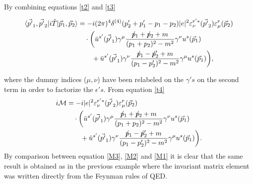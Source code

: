 \begin{example}
\begin{footnotesize}
\begin{equation}
\begin{split}
		\end{split}
		\label{t3}
	\end{equation}
	\end{footnotesize} 
	By combining equations \eqref{t2} and \eqref{t3}
	\begin{footnotesize}
	 \begin{equation}
		\begin{split}
			\braket{\vec{p'}_1,\vec{p'}_2|i\hat{T}|\vec{p}_1, \vec{p}_2}&=-i(2\pi)^4\delta^{(4)}(p'_2+p'_1-p_1-p_2)|e|^2\varepsilon_\nu^{r'*}(\vec{p'}_2)\varepsilon_\mu^{r}(\vec{p}_2)\\
			&\quad\cdot\bigg(\bar{u}^{s'}(\vec{p'}_1)\gamma^\mu \frac{\slashed p_1+\slashed p_2+m}{(p_1+p_2)^2-m^2}\gamma^\nu u^s(\vec{p}_1)\\
			&\qquad+\bar{u}^{s'}(\vec{p'}_1)\gamma^\nu \frac{\slashed p_1-\slashed p'_2+m}{(p_1-p'_2)^2-m^2}\gamma^\mu u^s(\vec{p}_1)\bigg),
		\end{split}
		\label{t4}
	\end{equation}
	\end{footnotesize} 
	where the dummy indices ($\mu,\nu$) have been relabeled on the $\gamma's$ on the second term in order to factorize the $\epsilon's$. From equation \eqref{t4}
	 \begin{equation}
		\begin{split}
			i\mathcal{M}&=-i|e|^2\varepsilon_\nu^{r'*}(\vec{p'}_2)\varepsilon_\mu^{r}(\vec{p}_2)\\
			&\quad\cdot\bigg(\bar{u}^{s'}(\vec{p'}_1)\gamma^\mu \frac{\slashed p_1+\slashed p_2+m}{(p_1+p_2)^2-m^2}\gamma^\nu u^s(\vec{p}_1)\\
			&\qquad+\bar{u}^{s'}(\vec{p'}_1)\gamma^\nu \frac{\slashed p_1-\slashed p'_2+m}{(p_1-p'_2)^2-m^2}\gamma^\mu u^s(\vec{p}_1)\bigg).
		\end{split}
		\label{M3}
	\end{equation} 
	By comparison between equation \eqref{M3}, \eqref{M2} and \eqref{M1} it is clear that the same result is obtained as in the previous example where the invariant matrix element was written directly from the Feynman rules of QED.
	
\end{example}

